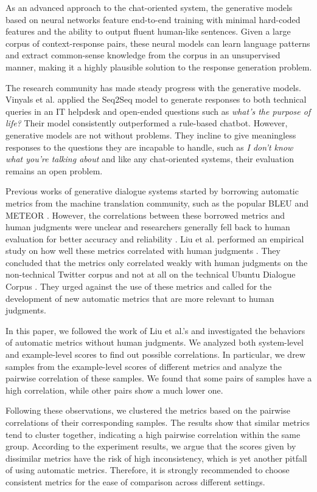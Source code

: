 \documentclass[runningheads]{llncs}
\begin{document}
    As an advanced approach to the chat-oriented system, the generative models based on neural networks feature end-to-end training with minimal hard-coded features and the ability to output fluent human-like sentences. Given a large corpus of context-response pairs, these neural models can learn language patterns and extract common-sense knowledge from the corpus in an unsupervised manner, making it a highly plausible solution to the response generation problem.

    The research community has made steady progress with the generative models. Vinyals et al. \cite{GoogleChatbot} applied the Seq2Seq model \cite{Seq2Seq} to generate responses to both technical queries in an IT helpdesk and open-ended questions such as \textit{what's the purpose of life?} Their model consistently outperformed a rule-based chatbot. However, generative models are not without problems. They incline to give meaningless responses to the questions they are incapable to handle, such as \textit{I don't know what you're talking about} and like any chat-oriented systems, their evaluation remains an open problem.

    Previous works of generative dialogue systems started by borrowing automatic metrics from the machine translation community, such as the popular BLEU \cite{BLEU} and METEOR \cite{METEOR}. However, the correlations between these borrowed metrics and human judgments were unclear and researchers generally fell back to human evaluation for better accuracy and reliability \cite{Shang,DCGM,VHRED}. Liu et al. performed an empirical study on how well these metrics correlated with human judgments \cite{HowNot}. They concluded that the metrics only correlated weakly with human judgments on the non-technical Twitter corpus and not at all on the technical Ubuntu Dialogue Corpus \cite{ubuntu_corpus}. They urged against the use of these metrics and called for the development of new automatic metrics that are more relevant to human judgments.

    In this paper, we followed the work of Liu et al.'s and investigated the behaviors of automatic metrics without human judgments. We analyzed both system-level and example-level scores to find out possible correlations. In particular, we drew samples from the example-level scores of different metrics and analyze the pairwise correlation of these samples. We found that some pairs of samples have a high correlation, while other pairs show a much lower one.

    Following these observations, we clustered the metrics based on the pairwise correlations of their corresponding samples. The results show that similar metrics tend to cluster together, indicating a high pairwise correlation within the same group. According to the experiment results, we argue that the scores given by dissimilar metrics have the risk of high inconsistency, which is yet another pitfall of using automatic metrics. Therefore, it is strongly recommended to choose consistent metrics for the ease of comparison across different settings.
\end{document}
